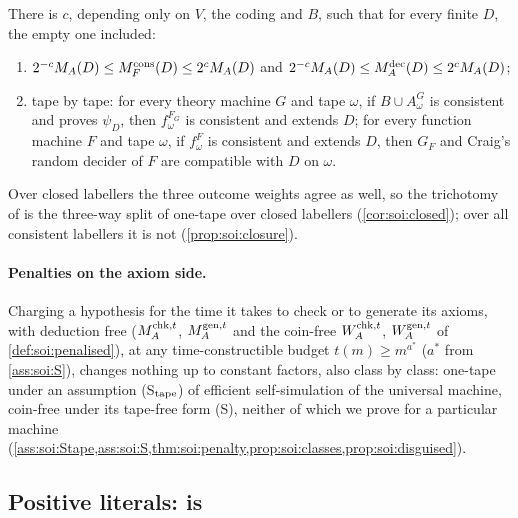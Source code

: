 \begin{theorem}\label{thm:soi:onetape}
There is $c$, depending only on $V$, the coding and $B$, such that for every finite $D$, the empty one included:
\begin{enumerate}[label=(\alph*),leftmargin=*]
\item $2^{-c}M_{A}(D)\le M_{F}^{\mathrm{cons}}(D)\le2^cM_{A}(D)$ and $2^{-c}M_{A}(D)\le M_{A}^{\mathrm{dec}}(D)\le2^cM_{A}(D)$;
\item tape by tape: for every theory machine $G$ and tape $\omega$, if $B\cup A^G_\omega$ is consistent and proves $\psi_D$, then $f^{F_G}_\omega$ is consistent and extends $D$; for every function machine $F$ and tape $\omega$, if $f^F_\omega$ is consistent and extends $D$, then $G_F$ and Craig's random decider of $F$ are compatible with $D$ on $\omega$.
\end{enumerate}
\end{theorem}

Over closed labellers the three outcome weights agree as well, so the trichotomy of \SAIabbr is the three-way split of one-tape \SOIabbr over closed labellers (\cref{cor:soi:closed}); over all consistent labellers it is not (\cref{prop:soi:closure}).

\paragraph{Penalties on the axiom side.} Charging a hypothesis for the time it takes to check or to generate its axioms, with deduction free ($M_{A}^{\mathrm{chk},t}$, $M_{A}^{\mathrm{gen},t}$ and the coin-free $W_{A}^{\mathrm{chk},t}$, $W_{A}^{\mathrm{gen},t}$ of \cref{def:soi:penalised}), at any time-constructible budget $t(m)\ge m^{a^*}$ ($a^*$ from \cref{ass:soi:S}), changes nothing up to constant factors, also class by class: one-tape under an assumption (S$_{\rm tape}$) of efficient self-simulation of the universal machine, coin-free under its tape-free form (S), neither of which we prove for a particular machine (\cref{ass:soi:Stape,ass:soi:S,thm:soi:penalty,prop:soi:classes,prop:soi:disguised}).

\subsection{Positive literals: \SAIabbr is \SOIabbr}\label{sec:soi:literals}

